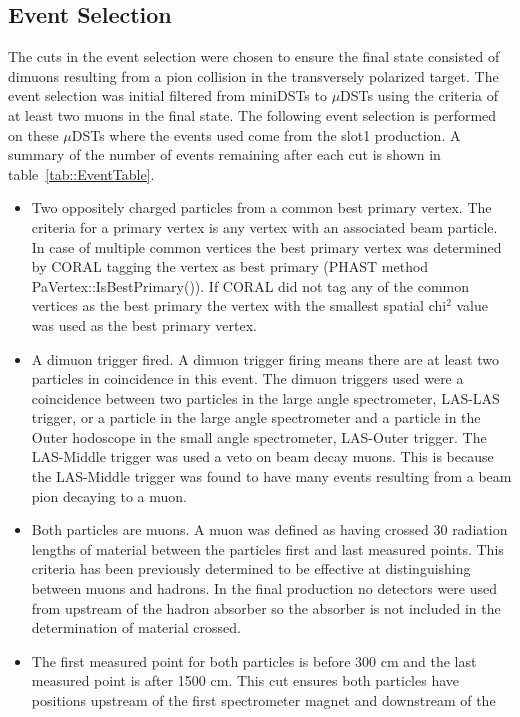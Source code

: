 \subsection{Event Selection}
The cuts in the event selection were chosen to ensure the final state consisted
of dimuons resulting from a pion collision in the transversely polarized target.
The event selection was initial filtered from miniDSTs to $\mu$DSTs using the
criteria of at least two muons in the final state.  The following event
selection is performed on these $\mu$DSTs where the events used come from the
slot1 production.  A summary of the number of events remaining after each cut is
shown in table~\ref{tab::EventTable}.

\begin{itemize}
\item Two oppositely charged particles from a common best primary vertex.  The
  criteria for a primary vertex is any vertex with an associated beam particle.
  In case of multiple common vertices the best primary vertex was determined by
  CORAL tagging the vertex as best primary (PHAST method
  PaVertex::IsBestPrimary()).  If CORAL did not tag any of the common vertices
  as the best primary the vertex with the smallest spatial chi$^2$ value was
  used as the best primary vertex.
\item A dimuon trigger fired.  A dimuon trigger firing means there are at least
  two particles in coincidence in this event. The dimuon triggers used were a
  coincidence between two particles in the large angle spectrometer, LAS-LAS
  trigger, or a particle in the large angle spectrometer and a particle in the
  Outer hodoscope in the small angle spectrometer, LAS-Outer trigger.  The
  LAS-Middle trigger was used a veto on beam decay muons.  This is because the
  LAS-Middle trigger was found to have many events resulting from a beam pion
  decaying to a muon.
\item Both particles are muons.  A muon was defined as having crossed 30
  radiation lengths of material between the particles first and last measured
  points.  This criteria has been previously determined to be effective at
  distinguishing between muons and hadrons.  In the final production no
  detectors were used from upstream of the hadron absorber so the absorber is
  not included in the determination of material crossed.
\item The first measured point for both particles is before 300 cm and the last
  measured point is after 1500 cm.  This cut ensures both particles have
  positions upstream of the first spectrometer magnet and downstream of the

\end{itemize}
